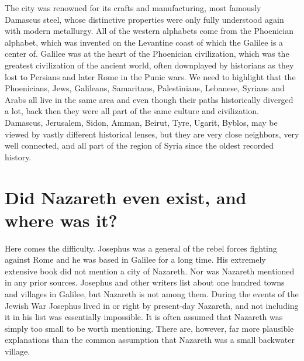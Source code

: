 The city was renowned for its crafts and manufacturing, most famously Damascus steel, whose distinctive properties were only fully understood again with modern metallurgy.
All of the western alphabets come from the Phoenician alphabet, which was invented on the Levantine coast of which the Galilee is a center of.
Galilee was at the heart of the Phoenician civilization, which was the greatest civilization of the ancient world, often downplayed by historians as they lost to Persians and later Rome in the Punic wars.
We need to highlight that the Phoenicians, Jews, Galileans, Samaritans, Palestinians, Lebanese, Syrians and Arabs all live in the same area and even though their paths historically diverged a lot, back then they were all part of the same culture and civilization.
Damascus, Jerusalem, Sidon, Amman, Beirut, Tyre, Ugarit, Byblos, may be viewed by vastly different historical lenses, but they are very close neighbors, very well connected, and all part of the region of Syria since the oldest recorded history.

\section{Did Nazareth even exist, and where was it?}\label{sec:did-nazareth-exist}

Here comes the difficulty.
Josephus was a general of the rebel forces fighting against Rome and he was based in Galilee for a long time.
His extremely extensive book \cite{josephus:life} did not mention a city of Nazareth.
Nor was Nazareth mentioned in any prior sources.
Josephus and other writers list about one hundred towns and villages in Galilee, but Nazareth is not among them.
During the events of the Jewish War Josephus lived in or right by present-day Nazareth, and not including it in his list was essentially impossible.
It is often assumed that Nazareth was simply too small to be worth mentioning.
There are, however, far more plausible explanations than the common assumption that Nazareth was a small backwater village.

